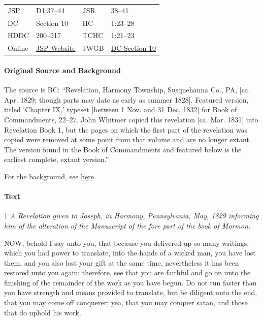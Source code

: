 				\begin{tabular}{p{1in}p{1.5in}p{1in}p{1.5in}}
				JSP	 	& D1:37--44		& JSR 		& 38--41	 \\  
				DC	 	& Section 10 	& HC 		& 1:23--28	 \\
				HDDC 	& 200--217 		& TCHC 		& 1:21--23	 \\
				Online  & \href{https://www.josephsmithpapers.org/paper-summary/revelation-spring-1829-dc-10/1}{JSP Website} & 
				JWGB	& \hyperref[DC10]{DC Section 10} \\
				\end{tabular}
			
			\paragraph{Original Source and Background}
			
				The source is BC: ``Revelation, Harmony Township, Susquehanna Co., PA, [ca. Apr. 1829; though parts may date as early as summer 1828]. Featured version, titled `Chapter IX,' typeset [between 1 Nov. and 31 Dec. 1832] for Book of Commandments, 22--27. John Whitmer copied this revelation [ca. Mar. 1831] into Revelation Book 1, but the pages on which the first part of the revelation was copied were removed at some point from that volume and are no longer extant. The version found in the Book of Commandments and featured below is the earliest complete, extant version.''
				
				For the background, see \hyperref[DC10-HB]{here}.
			
			\paragraph{Text}
			
				1 \textit{A Revelation given to Joseph, in Harmony, Pennsylvania, May, 1829 informing him of the alteration of the Manuscript of the fore part of the book of Mormon.}

				NOW, behold I say unto you, that because you delivered up so many writings, which you had power to translate, into the hands of a wicked man, you have lost them, and you also lost your gift at the same time, nevertheless it has been restored unto you again: therefore, see that you are faithful and go on unto the finishing of the remainder of the work as you have begun. Do not run faster than you have strength and means provided to translate, but be diligent unto the end, that you may come off conquerer; yea, that you may conquer satan, and those that do uphold his work.


